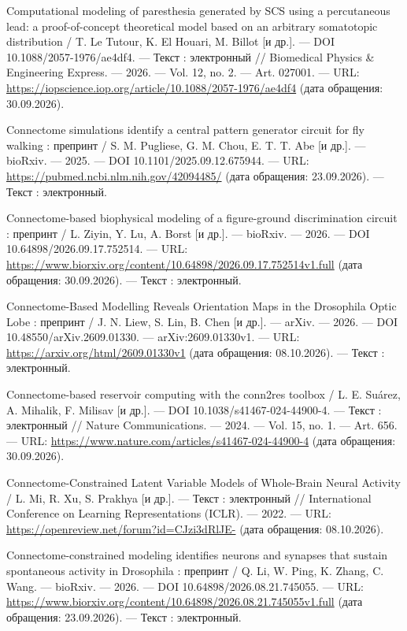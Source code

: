 \begin{list}{}{\setlength{\leftmargin}{10mm}\setlength{\labelwidth}{8mm}\setlength{\labelsep}{2mm}\setlength{\itemsep}{0pt}\setlength{\parsep}{0pt}\setlength{\topsep}{0pt}}
\item[63.] Computational modeling of paresthesia generated by SCS using a percutaneous lead: a proof-of-concept theoretical model based on an arbitrary somatotopic distribution / T. Le Tutour, K. El Houari, M. Billot [и др.]. — DOI 10.1088/2057-1976/ae4df4. — Текст : электронный // Biomedical Physics \& Engineering Express. — 2026. — Vol. 12, no. 2. — Art. 027001. — URL: \url{https://iopscience.iop.org/article/10.1088/2057-1976/ae4df4} (дата обращения: 30.09.2026).
\item[64.] Connectome simulations identify a central pattern generator circuit for fly walking : препринт / S. M. Pugliese, G. M. Chou, E. T. T. Abe [и др.]. — bioRxiv. — 2025. — DOI 10.1101/2025.09.12.675944. — URL: \url{https://pubmed.ncbi.nlm.nih.gov/42094485/} (дата обращения: 23.09.2026). — Текст : электронный.
\item[65.] Connectome-based biophysical modeling of a figure-ground discrimination circuit : препринт / L. Ziyin, Y. Lu, A. Borst [и др.]. — bioRxiv. — 2026. — DOI 10.64898/2026.09.17.752514. — URL: \url{https://www.biorxiv.org/content/10.64898/2026.09.17.752514v1.full} (дата обращения: 30.09.2026). — Текст : электронный.
\item[66.] Connectome-Based Modelling Reveals Orientation Maps in the Drosophila Optic Lobe : препринт / J. N. Liew, S. Lin, B. Chen [и др.]. — arXiv. — 2026. — DOI 10.48550/arXiv.2609.01330. — arXiv:2609.01330v1. — URL: \url{https://arxiv.org/html/2609.01330v1} (дата обращения: 08.10.2026). — Текст : электронный.
\item[67.] Connectome-based reservoir computing with the conn2res toolbox / L. E. Suárez, A. Mihalik, F. Milisav [и др.]. — DOI 10.1038/s41467-024-44900-4. — Текст : электронный // Nature Communications. — 2024. — Vol. 15, no. 1. — Art. 656. — URL: \url{https://www.nature.com/articles/s41467-024-44900-4} (дата обращения: 30.09.2026).
\item[68.] Connectome-Constrained Latent Variable Models of Whole-Brain Neural Activity / L. Mi, R. Xu, S. Prakhya [и др.]. — Текст : электронный // International Conference on Learning Representations (ICLR). — 2022. — URL: \url{https://openreview.net/forum?id=CJzi3dRlJE-} (дата обращения: 08.10.2026).
\item[69.] Connectome-constrained modeling identifies neurons and synapses that sustain spontaneous activity in Drosophila : препринт / Q. Li, W. Ping, K. Zhang, C. Wang. — bioRxiv. — 2026. — DOI 10.64898/2026.08.21.745055. — URL: \url{https://www.biorxiv.org/content/10.64898/2026.08.21.745055v1.full} (дата обращения: 23.09.2026). — Текст : электронный.

\end{list}
